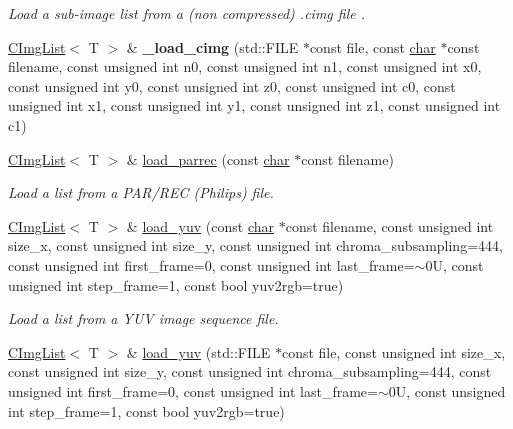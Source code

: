 \begin{DoxyCompactItemize}
\begin{DoxyCompactList}\small\item\em Load a sub-\/image list from a (non compressed) .cimg file . \end{DoxyCompactList}\item 
\mbox{\label{structcimg__library__suffixed_1_1CImgList_aa9ad627e46b5cb538a00a2c3e79e0040}} 
\hyperlink{structcimg__library__suffixed_1_1CImgList}{C\+Img\+List}$<$ T $>$ \& {\bfseries \+\_\+load\+\_\+cimg} (std\+::\+F\+I\+LE $\ast$const file, const \hyperlink{classchar}{char} $\ast$const filename, const unsigned int n0, const unsigned int n1, const unsigned int x0, const unsigned int y0, const unsigned int z0, const unsigned int c0, const unsigned int x1, const unsigned int y1, const unsigned int z1, const unsigned int c1)
\item 
\hyperlink{structcimg__library__suffixed_1_1CImgList}{C\+Img\+List}$<$ T $>$ \& \hyperlink{structcimg__library__suffixed_1_1CImgList_affbfd21835dfd5c00fe98cc71c7760c2}{load\+\_\+parrec} (const \hyperlink{classchar}{char} $\ast$const filename)
\begin{DoxyCompactList}\small\item\em Load a list from a P\+A\+R/\+R\+EC (Philips) file. \end{DoxyCompactList}\item 
\hyperlink{structcimg__library__suffixed_1_1CImgList}{C\+Img\+List}$<$ T $>$ \& \hyperlink{structcimg__library__suffixed_1_1CImgList_a0ac27f8d085293611c34225b0fc29a81}{load\+\_\+yuv} (const \hyperlink{classchar}{char} $\ast$const filename, const unsigned int size\+\_\+x, const unsigned int size\+\_\+y, const unsigned int chroma\+\_\+subsampling=444, const unsigned int first\+\_\+frame=0, const unsigned int last\+\_\+frame=$\sim$0\+U, const unsigned int step\+\_\+frame=1, const bool yuv2rgb=true)
\begin{DoxyCompactList}\small\item\em Load a list from a Y\+UV image sequence file. \end{DoxyCompactList}\item 
\mbox{\label{structcimg__library__suffixed_1_1CImgList_a0dbd7bdcae95f771dc46aee17d87c347}} 
\hyperlink{structcimg__library__suffixed_1_1CImgList}{C\+Img\+List}$<$ T $>$ \& \hyperlink{structcimg__library__suffixed_1_1CImgList_a0dbd7bdcae95f771dc46aee17d87c347}{load\+\_\+yuv} (std\+::\+F\+I\+LE $\ast$const file, const unsigned int size\+\_\+x, const unsigned int size\+\_\+y, const unsigned int chroma\+\_\+subsampling=444, const unsigned int first\+\_\+frame=0, const unsigned int last\+\_\+frame=$\sim$0\+U, const unsigned int step\+\_\+frame=1, const bool yuv2rgb=true)

\end{DoxyCompactItemize}
